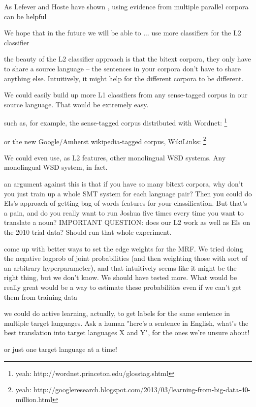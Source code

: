 \documentclass[11pt,letterpaper]{article}
\begin{document}
As Lefever and Hoste have shown \cite{lefever-hoste-decock:2011:ACL-HLT2011},
using evidence from multiple parallel corpora can be helpful 

We hope that in the future we will be able to ...
 use more classifiers for the L2 classifier

 the beauty of the L2 classifier approach is that the bitext corpora, they
only have to share a source language -- the sentences in your corpora don't
have to share anything else. Intuitively, it might help for the different
corpora to be different.

We could easily build up more L1 classifiers from any sense-tagged corpus in
our source language. That would be extremely easy.

such as, for example, the sense-tagged corpus distributed with Wordnet:
\footnote{yeah: http://wordnet.princeton.edu/glosstag.shtml}

or the new Google/Amherst wikipedia-tagged corpus, WikiLinks:
\footnote{yeah: http://googleresearch.blogspot.com/2013/03/learning-from-big-data-40-million.html}

We could even use, as L2 features, other monolingual WSD systems. Any
monolingual WSD system, in fact.


an argument against this is that if you have so many bitext corpora, why
don't you just train up a whole SMT system for each language pair? Then you
could do Els's approach of getting bag-of-words features for your
classification. But that's a pain, and do you really want to run Joshua five
times every time you want to translate a noun? IMPORTANT QUESTION: does our L2
work as well as Els on the 2010 trial data? Should run that whole experiment.


come up with better ways to set the edge weights for the MRF. We tried doing
the negative logprob of joint probabilities (and then weighting those with
sort of an arbitrary hyperparameter), and that intuitively seems like it might
be the right thing, but we don't know. We should have tested more. What would
be really great would be a way to estimate these probabilities even if we
can't get them from training data

we could do active learning, actually, to get labels for the same sentence
in multiple target languages. Ask a human "here's a sentence in English, what's
the best translation into target languages X and Y", for the ones we're unsure
about!

or just one target language at a time!
\end{document}
